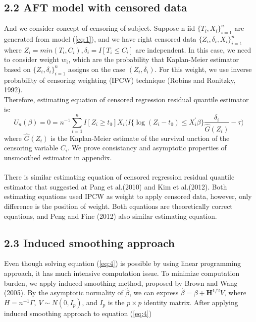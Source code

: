 \documentclass[12pt]{article}
\begin{document}
\subsection{2.2 AFT model with censored data}
	\noindent And we consider concept of censoring of subject. Suppose n iid $\{T_i, X_i\}_{i=1}^{n}$ are generated from model (\ref{eq:1}), and we have right censored data $\{Z_i, \delta_i, X_i \}_{i=1}^{n}$ where $Z_i=min(T_i,C_i), \delta_i = I[T_i \leq C_i]$ are independent. In this case, we need to consider weight $w_i$, which are the probability that Kaplan-Meier estimator based on $\{Z_i, \delta_i \}_{i=1}^{n}$ assigns on the case $(Z_i, \delta_i)$. For this weight, we use inverse probability of censoring weighting (IPCW) technique (Robins and Ronitzky, 1992).\\
	
	\noindent Therefore, estimating equation of censored regression residual quantile estimator is:
	\begin{equation} \label{eq:4}
	U_n(\beta) = 0 = n^{-1}\sum_{i=1}^{n}I[Z_i \ge t_0] X_i \Big(I\{\log(Z_i - t_0) \leq X_i^{\prime}\beta\} \frac{\delta_i}{\hat{G}(Z_i)}  -\tau \Big)
	\end{equation}
	where $\hat{G}(Z_i)$ is the Kaplan-Meier estimate of the survival unction of the censoring variable $C_i$. We prove consistancy and asymptotic properties of unsmoothed estimator in appendix.\\
	\\
	There is similar estimating equation of censored regression residual quantile estimator that suggested at Pang et al.(2010) and Kim et al.(2012). Both estimating equations used IPCW as weight to apply censored data, however, only difference is the position of weight. Both equations are theoretically correct equations, and Peng and Fine (2012) also similar estimating equation.\\

\subsection{2.3 Induced smoothing approach}
	\noindent Even though solving equation (\ref{eq:4}) is possible by using linear programming approach, it has much intensive computation issue. To minimize computation burden, we apply induced smoothing method, proposed by Brown and Wang (2005). By the asymptotic normality of $\hat{\beta}$, we can express $\hat{\beta} = \beta+\textbf{H}^{1/2}V$, where $H = n^{-1}\Gamma,\ V \sim N(0, I_p)$, and $I_p$ is the $p \times p $ identity matrix. After applying induced smoothing approach to equation (\ref{eq:4})
	
\end{document}

